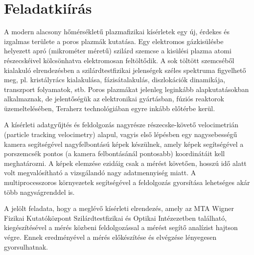 \chapter*{Feladatkiírás}

A modern alacsony hőmérsékletű plazmafizikai kísérletek egy új, érdekes és izgalmas területe a poros plazmák
kutatása. Egy elektromos gázkisülésbe helyezett apró (mikrométer méretű) szilárd szemcse a kisülési plazma
atomi részecskéivel kölcsönhatva elektromosan feltöltődik. A sok töltött szemcséből kialakuló elrendezésben a
szilárdtestfizikai jelenségek széles spektruma figyelhető meg, pl. kristályrács kialakulása, fázisátalakulás,
diszlokációk dinamikája, transzport folyamatok, stb. Poros plazmákat jelenleg leginkább alapkutatásokban
alkalmaznak, de jelentőségük az elektronikai gyártásban, fúziós reaktorok üzemeltelésében, Teraherz
technológiában egyre inkább előtérbe kerül.

A kísérleti adatgyűjtés és feldolgozás nagyrésze részecske-követő velocimetrián (particle tracking velocimetry)
alapul, vagyis első lépésben egy nagysebességű kamera segítségével nagyfelbontású képek készülnek, amely
képek segítségével a porszemcsék pontos (a kamera felbontásánál pontosabb) koordinátáit kell meghatározni. A
képek elemzése ezidáig csak a mérést követően, hosszú idő alatt volt megvalósítható a vizsgálandó nagy
adatmennyiség miatt. A multiprocesszoros környezetek segítségével a feldolgozás gyorsítása lehetséges akár
több nagyságrenddel is.

A jelölt feladata, hogy a meglévő kísérleti elrendezés, amely az MTA Wigner Fizikai Kutatóközpont
Szilárdtestfizikai és Optikai Intézezetben található, kiegészítésével a mérés közbeni feldolgozással a mérést
segítő analízist hajtson végre. Ennek eredményével a mérés előkészítése és elvégzése lényegesen gyorsulhatnak.

